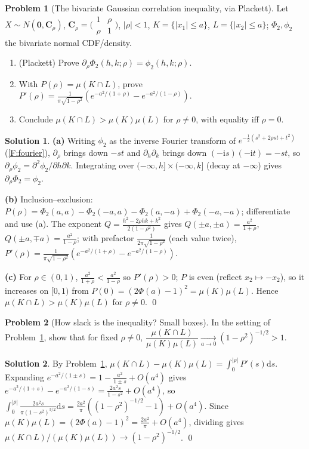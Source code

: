 \documentclass[12pt,a4paper]{article}
\theoremstyle{definition}
\newtheorem{exercise}{Problem}
\newtheorem*{solution*}{Solution}
\newcommand{\dd}{\mathrm{d}}
\newcommand{\bC}{\mathbf{C}}
\newcommand{\bzero}{\mathbf{0}}
\begin{document}
\begin{exercise}[The bivariate Gaussian correlation inequality, via Plackett]\label{prob:box}
Let $X\sim N(\bzero,\bC_\rho)$, $\bC_\rho=\bigl(\begin{smallmatrix}1&\rho\\\rho&1\end{smallmatrix}\bigr)$, $|\rho|<1$, $K=\{|x_1|\le a\}$, $L=\{|x_2|\le a\}$; $\Phi_2,\phi_2$ the bivariate normal CDF/density.
\begin{enumerate}[label=(\alph*)]
\item (Plackett) Prove $\partial_\rho\Phi_2(h,k;\rho)=\phi_2(h,k;\rho)$.
\item With $P(\rho)=\mu(K\cap L)$, prove $P'(\rho)=\tfrac1{\pi\sqrt{1-\rho^2}}(e^{-a^2/(1+\rho)}-e^{-a^2/(1-\rho)})$.
\item Conclude $\mu(K\cap L)>\mu(K)\mu(L)$ for $\rho\neq0$, with equality iff $\rho=0$.
\end{enumerate}
\end{exercise}
\begin{solution*}
\textbf{(a)} Writing $\phi_2$ as the inverse Fourier transform of $e^{-\frac12(s^2+2\rho st+t^2)}$ (\ref{F:fourier}), $\partial_\rho$ brings down $-st$ and $\partial_h\partial_k$ brings down $(-\mathrm is)(-\mathrm it)=-st$, so $\partial_\rho\phi_2=\partial^2\phi_2/\partial h\partial k$. Integrating over $(-\infty,h]\times(-\infty,k]$ (decay at $-\infty$) gives $\partial_\rho\Phi_2=\phi_2$.

\textbf{(b)} Inclusion--exclusion: $P(\rho)=\Phi_2(a,a)-\Phi_2(-a,a)-\Phi_2(a,-a)+\Phi_2(-a,-a)$; differentiate and use (a). The exponent $Q=\tfrac{h^2-2\rho hk+k^2}{2(1-\rho^2)}$ gives $Q(\pm a,\pm a)=\tfrac{a^2}{1+\rho}$, $Q(\pm a,\mp a)=\tfrac{a^2}{1-\rho}$; with prefactor $\tfrac1{2\pi\sqrt{1-\rho^2}}$ (each value twice), $P'(\rho)=\tfrac1{\pi\sqrt{1-\rho^2}}(e^{-a^2/(1+\rho)}-e^{-a^2/(1-\rho)})$.

\textbf{(c)} For $\rho\in(0,1)$, $\tfrac{a^2}{1+\rho}<\tfrac{a^2}{1-\rho}$ so $P'(\rho)>0$; $P$ is even (reflect $x_2\mapsto-x_2$), so it increases on $[0,1)$ from $P(0)=(2\Phi(a)-1)^2=\mu(K)\mu(L)$. Hence $\mu(K\cap L)>\mu(K)\mu(L)$ for $\rho\neq0$. \qed
\end{solution*}

\begin{exercise}[How slack is the inequality? Small boxes]\label{prob:smalla}
In the setting of Problem~\ref{prob:box}, show that for fixed $\rho\neq0$, $\dfrac{\mu(K\cap L)}{\mu(K)\mu(L)}\xrightarrow[a\to0]{}(1-\rho^2)^{-1/2}>1$.
\end{exercise}
\begin{solution*}
By Problem~\ref{prob:box}, $\mu(K\cap L)-\mu(K)\mu(L)=\int_0^{|\rho|}P'(s)\dd s$. Expanding $e^{-a^2/(1\pm s)}=1-\tfrac{a^2}{1\pm s}+O(a^4)$ gives $e^{-a^2/(1+s)}-e^{-a^2/(1-s)}=\tfrac{2a^2s}{1-s^2}+O(a^4)$, so $\int_0^{|\rho|}\tfrac{2a^2s}{\pi(1-s^2)^{3/2}}\dd s=\tfrac{2a^2}\pi((1-\rho^2)^{-1/2}-1)+O(a^4)$. Since $\mu(K)\mu(L)=(2\Phi(a)-1)^2=\tfrac{2a^2}\pi+O(a^4)$, dividing gives $\mu(K\cap L)/(\mu(K)\mu(L))\to(1-\rho^2)^{-1/2}$. \qed
\end{solution*}
\end{document}
